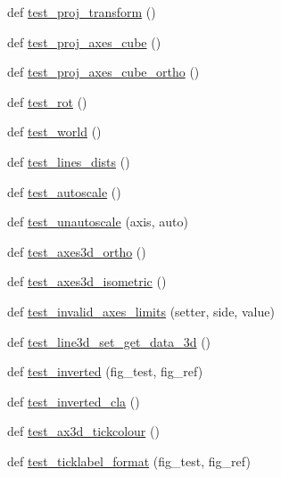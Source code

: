 \begin{DoxyCompactItemize}
\item 
def \hyperlink{namespacetests_1_1test__mplot3d_a6396e5133b14530b3fc4b204b64ccc44}{test\+\_\+proj\+\_\+transform} ()
\item 
def \hyperlink{namespacetests_1_1test__mplot3d_a439a108829cd51454375519a654950fe}{test\+\_\+proj\+\_\+axes\+\_\+cube} ()
\item 
def \hyperlink{namespacetests_1_1test__mplot3d_a1cb01ff01c80e0d78238a9797542ff0a}{test\+\_\+proj\+\_\+axes\+\_\+cube\+\_\+ortho} ()
\item 
def \hyperlink{namespacetests_1_1test__mplot3d_ac47952f89f738780bb461c276fa2bc34}{test\+\_\+rot} ()
\item 
def \hyperlink{namespacetests_1_1test__mplot3d_a9489ed86ed20dfb14c148d3922370f6f}{test\+\_\+world} ()
\item 
def \hyperlink{namespacetests_1_1test__mplot3d_ac48a6f2d7fadcadc24a0f78eaeef438f}{test\+\_\+lines\+\_\+dists} ()
\item 
def \hyperlink{namespacetests_1_1test__mplot3d_a757a32ad3fec6cea5b8aba098d7b4f61}{test\+\_\+autoscale} ()
\item 
def \hyperlink{namespacetests_1_1test__mplot3d_a657038ca039c8549d15e7ab04ba39743}{test\+\_\+unautoscale} (axis, auto)
\item 
def \hyperlink{namespacetests_1_1test__mplot3d_ad621937b5e69f1e9c3c18ad979c8d946}{test\+\_\+axes3d\+\_\+ortho} ()
\item 
def \hyperlink{namespacetests_1_1test__mplot3d_a50a664841c33808281d50f1bcac3bb6b}{test\+\_\+axes3d\+\_\+isometric} ()
\item 
def \hyperlink{namespacetests_1_1test__mplot3d_ab754faf9cce9f6df2d3d84820a563a3d}{test\+\_\+invalid\+\_\+axes\+\_\+limits} (setter, side, value)
\item 
def \hyperlink{namespacetests_1_1test__mplot3d_af72d525c1582510136328262ad6707dc}{test\+\_\+line3d\+\_\+set\+\_\+get\+\_\+data\+\_\+3d} ()
\item 
def \hyperlink{namespacetests_1_1test__mplot3d_a52623134ad3e51ef6ca0136c9c14473d}{test\+\_\+inverted} (fig\+\_\+test, fig\+\_\+ref)
\item 
def \hyperlink{namespacetests_1_1test__mplot3d_ad95a277e29809e46eb825073a6cb901c}{test\+\_\+inverted\+\_\+cla} ()
\item 
def \hyperlink{namespacetests_1_1test__mplot3d_ab7a9756234ecad32200e1bfae4df9a42}{test\+\_\+ax3d\+\_\+tickcolour} ()
\item 
def \hyperlink{namespacetests_1_1test__mplot3d_a3015b39e0dee5af64bbf02cc9ea200fc}{test\+\_\+ticklabel\+\_\+format} (fig\+\_\+test, fig\+\_\+ref)

\end{DoxyCompactItemize}
